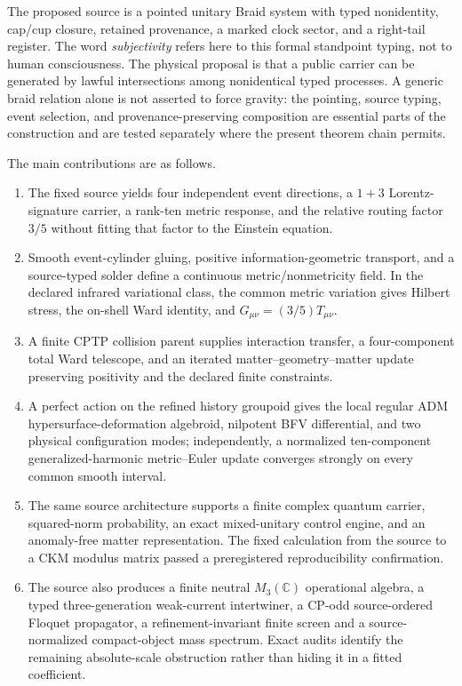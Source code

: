\documentclass[11pt]{article}
\theoremstyle{definition}
\theoremstyle{remark}
\begin{document}
The proposed source is a pointed unitary Braid system with typed nonidentity,
cap/cup closure, retained provenance, a marked clock sector, and a right-tail
register. The word \emph{subjectivity} refers here to this formal standpoint
typing, not to human consciousness. The physical proposal is that a public
carrier can be generated by lawful intersections among nonidentical typed
processes. A generic braid relation alone is not asserted to force gravity:
the pointing, source typing, event selection, and provenance-preserving
composition are essential parts of the construction and are tested separately
where the present theorem chain permits.

The main contributions are as follows.
\begin{enumerate}[label=(\roman*)]
  \item The fixed source yields four independent event directions, a
  $1+3$ Lorentz-signature carrier, a rank-ten metric response, and the relative
  routing factor $3/5$ without fitting that factor to the Einstein equation.
  \item Smooth event-cylinder gluing, positive information-geometric
  transport, and a source-typed solder define a continuous metric/nonmetricity
  field. In the declared infrared variational class, the common metric
  variation gives Hilbert stress, the on-shell Ward identity, and
  $G_{\mu\nu}=(3/5)T_{\mu\nu}$.
  \item A finite CPTP collision parent supplies interaction transfer, a
  four-component total Ward telescope, and an iterated matter--geometry--matter
  update preserving positivity and the declared finite constraints.
  \item A perfect action on the refined history groupoid gives the local
  regular ADM hypersurface-deformation algebroid, nilpotent BFV
  differential, and two physical configuration modes; independently, a
  normalized ten-component generalized-harmonic metric--Euler update converges
  strongly on every common smooth interval.
  \item The same source architecture supports a finite complex quantum
  carrier, squared-norm probability, an exact mixed-unitary control engine,
  and an anomaly-free matter representation. The fixed calculation from the
  source to a CKM modulus matrix passed a preregistered reproducibility
  confirmation.
  \item The source also produces a finite neutral $M_3(\mathbb C)$ operational
  algebra, a typed three-generation weak-current intertwiner, a CP-odd
  source-ordered Floquet propagator, a refinement-invariant finite screen and
  a source-normalized compact-object mass spectrum. Exact audits identify the
  remaining absolute-scale obstruction rather than hiding it in a fitted
  coefficient.
\end{enumerate}
\end{document}
